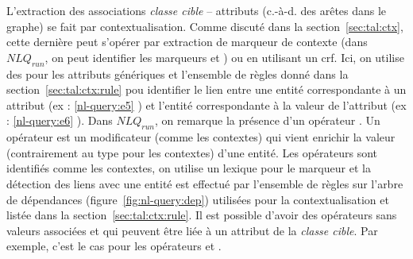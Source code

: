 L'extraction des associations \emph{classe cible} -- attributs (c.-à-d. des arêtes dans le graphe) se fait par contextualisation.
Comme discuté dans la section~\ref{sec:tal:ctx}, cette dernière peut s'opérer par extraction de marqueur de contexte (dans $NLQ_{run}$, on peut identifier les marqueurs  et ) ou en utilisant un \gls{crf}.
Ici, on utilise des  pour les attributs génériques et l'ensemble de règles donné dans la section~\ref{sec:tal:ctx:rule} pou identifier le lien entre une entité correspondante à un attribut (ex : \ref{nl-query:e5} ) et l'entité correspondante à la valeur de l'attribut (ex : \ref{nl-query:e6} ).
Dans $NLQ_{run}$, on remarque la présence d'un opérateur .
Un opérateur est un modificateur (comme les contextes) qui vient enrichir la valeur (contrairement au type pour les contextes) d'une entité.
Les opérateurs sont identifiés comme les contextes, on utilise un lexique pour le marqueur et la détection des liens avec une entité est effectué par l'ensemble de règles sur l'arbre de dépendances (figure~\ref{fig:nl-query:dep}) utilisées pour la contextualisation et listée dans la section~\ref{sec:tal:ctx:rule}.
Il est possible d'avoir des opérateurs sans valeurs associées et qui peuvent être liée à un attribut de la \emph{classe cible}.
Par exemple, c'est le cas pour les opérateurs  et .

